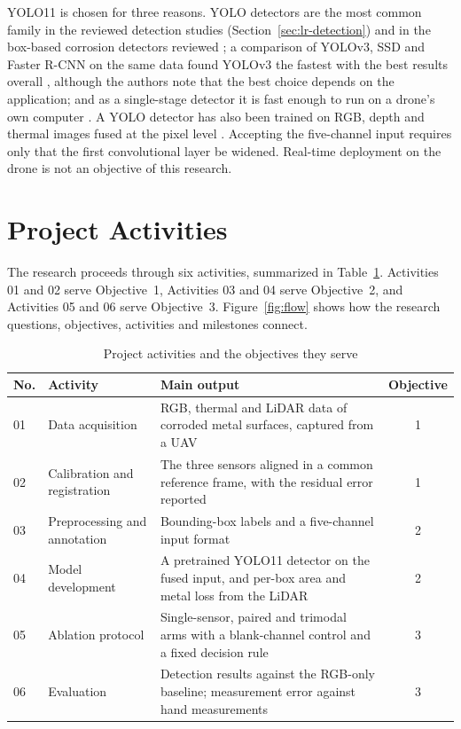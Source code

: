 YOLO11 is chosen for three reasons. YOLO detectors are the most common family in
the reviewed detection studies (Section~\ref{sec:lr-detection}) and in the
box-based corrosion detectors reviewed \citep{Mao2026,Fu2024,Bui2026,Li2024b,Yu2023};
a comparison of YOLOv3, SSD and Faster R-CNN on the same data found YOLOv3 the
fastest with the best results overall \citep{Srivastava2021}, although the
authors note that the best choice depends on the application; and as a
single-stage detector it is fast enough to run on a drone's own computer
\citep{Yu2023}. A YOLO detector has also been trained on RGB, depth and thermal images
fused at the pixel level \citep{Cao2026}. Accepting the five-channel input
requires only that the first convolutional layer be widened. Real-time
deployment on the drone is not an objective of this research.

\section{Project Activities}
\label{sec:project-activities}

The research proceeds through six activities, summarized in
Table~\ref{tab:activities}. Activities 01 and 02 serve Objective~1, Activities 03
and 04 serve Objective~2, and Activities 05 and 06 serve Objective~3. Figure~\ref{fig:flow} shows how the
research questions, objectives, activities and milestones connect.

\begin{table}[htbp]
\centering
\caption{Project activities and the objectives they serve}
\label{tab:activities}
\small
\renewcommand{\arraystretch}{1.2}
\begin{tabularx}{\textwidth}{@{}l>{\RaggedRight\arraybackslash}p{3.6cm}>{\RaggedRight\arraybackslash}Xc@{}}
\toprule
\textbf{No.} & \textbf{Activity} & \textbf{Main output} & \textbf{Objective} \\
\midrule
01 & Data acquisition & RGB, thermal and LiDAR data of corroded metal surfaces, captured from a UAV & 1 \\
02 & Calibration and registration & The three sensors aligned in a common reference frame, with the residual error reported & 1 \\
03 & Preprocessing and annotation & Bounding-box labels and a five-channel input format & 2 \\
04 & Model development & A pretrained YOLO11 detector on the fused input, and per-box area and metal loss from the LiDAR & 2 \\
05 & Ablation protocol & Single-sensor, paired and trimodal arms with a blank-channel control and a fixed decision rule & 3 \\
06 & Evaluation & Detection results against the RGB-only baseline; measurement error against hand measurements & 3 \\
\bottomrule
\end{tabularx}
\end{table}

